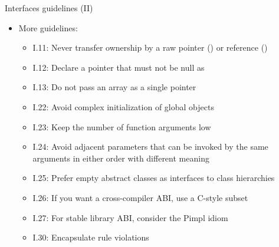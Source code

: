 \begin{frame}[t]{Interfaces guidelines (II)}
\begin{itemize}
  \item More guidelines:
  \begin{itemize}
    \item I.11: Never transfer ownership by a raw pointer () or reference ()
    \item I.12: Declare a pointer that must not be null as 
    \item I.13: Do not pass an array as a single pointer
    \item I.22: Avoid complex initialization of global objects
    \item I.23: Keep the number of function arguments low
    \item I.24: Avoid adjacent parameters that can be invoked by the same arguments in either order with different meaning
    \item I.25: Prefer empty abstract classes as interfaces to class hierarchies
    \item I.26: If you want a cross-compiler ABI, use a C-style subset
    \item I.27: For stable library ABI, consider the Pimpl idiom
    \item I.30: Encapsulate rule violations
  \end{itemize}
\end{itemize}
\end{frame}


